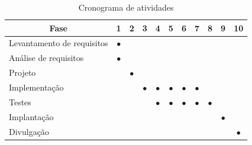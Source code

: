 \begin{table}[H]
	 \caption{Cronograma de atividades}
	 \label{tab:cronograma}
	 \begin{center}
		  \begin{tabular}{|l||c|c|c|c|c|c|c|c|c|c|}
			    \hline
			    \multicolumn{1}{|c||}{Fase} 	&1     			&2     			&3     			&4   			&5 				&6 			&7 			&8			&9				&10\\ \hline
			    Levantamento de requisitos 	& $\bullet$  	&           	&          		&         		&  				&  			&  			&			&	 			&\\
			    An\'alise de requisitos    	& $\bullet$     &  				& 				&         		&  				&  			&  			& 			&				&\\
			    Projeto   				   	&           	&$\bullet$    	& 				& 				&  				&  			&  			& 			&				&\\
			    Implementa\c{c}\~ao   	   	&           	&          		&$\bullet$   	&$\bullet$    	&$\bullet$		&$\bullet$ 	&$\bullet$ 	&			&				&\\
			    Testes    				   	&           	&           	& 				&$\bullet$ 		&$\bullet$ 		&$\bullet$ 	&$\bullet$  &$\bullet$	&				&\\
			    Implanta\c{c}\~ao    	   	&           	&           	&				& 				&  				&  			&  			&		 	&$\bullet$		&\\
			    Divulga\c{c}\~ao 		   	& 				& 				&				&				&				& 			&			& 			& 				&$\bullet$\\
			    \hline
			  \end{tabular}
		 \vspace{8pt} %
		 \end{center}
\end{table}
